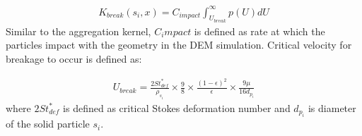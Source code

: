 \documentclass[review]{elsarticle}
\begin{document}
\begin{linenumbers}
\begin{align}
K_{break}(s_i,x) = C_{impact}\int_{U_{break}}^{\infty}p(U)dU
\label{eqn:mthds_pbm_breakage_kernel}
\end{align}
Similar to the aggregation kernel, $C_impact$ is defined as rate at which 
the particles impact with the geometry in the DEM simulation. Critical velocity 
for breakage to occur is defined as:

\begin{align}
U_{break}=\frac{2St^*_{def}}{\rho_{s_i}}\times\frac{9}{8}\times\frac{(1-\epsilon)^2}{\epsilon}\times\frac{9\mu}{16d_{p_i}}
\label{eqn:mthds_pbm_breakage_ubreak}
\end{align}
where $2St^*_{def}$ is defined as critical Stokes deformation number \citep{Iveson2001} and 
$d_{p_i}$ is diameter of the solid particle $s_i$.



\end{linenumbers}



\end{document}
